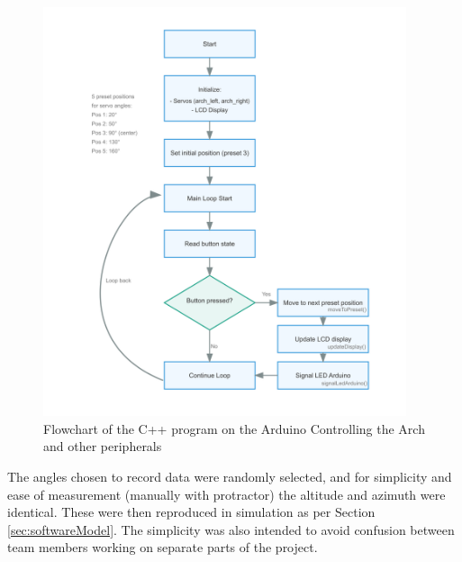 \begin{figure}[htbp] 
    \centering
    \includegraphics[width=0.95\textwidth]{chapters/methodology/RED/arch_flow.png}
    \caption{Flowchart of the C++ program on the Arduino Controlling the Arch and other peripherals}
    \label{fig:REDarchflowchart}
  \end{figure}
  
The angles chosen to record data were randomly selected, and for simplicity and ease of measurement (manually with protractor) the altitude and azimuth were identical. These were then reproduced in simulation as per Section \ref{sec:softwareModel}. The simplicity was also intended to avoid confusion between team members working on separate parts of the project.

%
